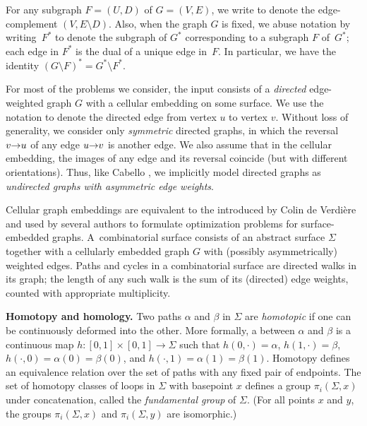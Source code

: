 \documentclass[twoside,leqno,twocolumn]{article}
\def\arcto{\mathord\shortrightarrow}
\def\arc#1#2{#1\arcto#2}
\def\fakeparagraph#1{\par\medskip\noindent\textbf{#1}}
\begin{document}
For any subgraph $F = (U,D)$ of $G = (V,E)$, we write  to denote the edge-complement $(V, E\setminus D)$.  Also, when the graph $G$ is fixed, we abuse notation by writing~$F^*$ to denote the subgraph of $G^*$ corresponding to a subgraph $F$ of~$G^*$; each edge in $F^*$ is the dual of a unique edge in~$F$.  In particular, we have the identity $(G\setminus F)^* = G^* \setminus F^*$.

For most of the problems we consider, the input consists of a \emph{directed} edge-weighted graph $G$ with a cellular embedding on some surface.  We use the notation \EMPH{$\arc{u}{v}$} to denote the directed edge from vertex $u$ to vertex $v$.  Without loss of generality, we consider only \emph{symmetric} directed graphs, in which the reversal $\arc{v}{u}$ of any edge $\arc{u}{v}$ is another edge.  We also assume that in the cellular embedding, the images of any edge and its reversal coincide (but with different orientations).  Thus, like Cabello \etal \cite[Section 2.3]{ccl-fsncd-10}, we implicitly model directed graphs as \emph{undirected graphs with asymmetric edge weights}.

Cellular graph embeddings are equivalent to the  introduced by Colin de Verdi\`ere~\cite{c-rcds-03} and used by several authors to formulate optimization problems for surface-embedded graphs.  A~combinatorial surface consists of an abstract surface $\Sigma$ together with a cellularly embedded graph $G$ with (possibly asymmetrically) weighted edges.  Paths and cycles in a combinatorial surface are directed walks in its graph; the length of any such walk is the sum of its (directed) edge weights, counted with appropriate multiplicity.

\fakeparagraph{Homotopy and homology.}
Two paths $\alpha$ and $\beta$ in $\Sigma$ are \emph{homotopic} if one can be continuously deformed into the other.  More formally, a  between $\alpha$ and $\beta$ is a continuous map $h\colon {[0,1]\times[0,1] \to \Sigma}$ such that $h(0,\cdot) = \alpha$, $h(1,\cdot) = \beta$, $h(\cdot,0) = \alpha(0) = \beta(0)$, and $h(\cdot,1) = \alpha(1) = \beta(1)$.  Homotopy defines an equivalence relation over the set of paths with any fixed pair of endpoints.  The set of homotopy classes of loops in $\Sigma$ with basepoint $x$ defines a group $\pi_i(\Sigma, x)$ under concatenation, called the \emph{fundamental group} of $\Sigma$.  (For all points $x$ and $y$, the groups $\pi_i(\Sigma,x)$ and $\pi_i(\Sigma,y)$ are isomorphic.)
\end{document}
